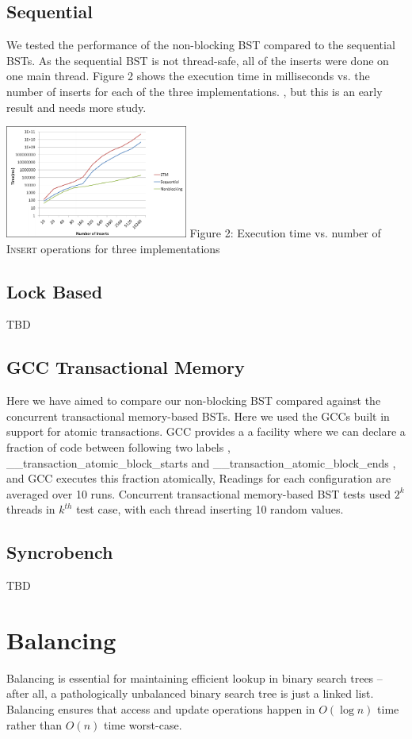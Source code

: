 \documentclass[10pt,pdftex,a4paper]{article}%
\begin{document}
\begin{multicols}{2}
\subsection{Sequential}
We tested the performance of the non-blocking BST compared to the sequential BSTs. As the sequential BST is not thread-safe, all of the inserts were done on one main thread. Figure 2 shows the execution time in milliseconds vs. the number of inserts for each of the three implementations. , but this is an early result and needs more study.
\begin{center}
\includegraphics[width=0.45\textwidth]{insertTime.png}
Figure 2: Execution time vs. number of \textsc{Insert} operations for three implementations
\end{center}
\subsection{Lock Based}
TBD
\subsection{GCC Transactional Memory}
Here we have aimed to compare our non-blocking BST compared against the concurrent transactional memory-based BSTs. Here we used the GCCs built in support for atomic transactions. GCC provides a a facility where we can declare a fraction of code between following two labels ,
\STATE\_\_transaction\_atomic\_block\_starts
and \STATE\_\_transaction\_atomic\_block\_ends
, and GCC executes this fraction atomically, Readings for each configuration are averaged over 10 runs.  Concurrent transactional memory-based BST tests used $2^k$ threads in $k^{th}$ test case, with each thread inserting 10 random values.

\subsection{Syncrobench}
TBD

\section{Balancing}
Balancing is essential for maintaining efficient lookup in binary search trees -- after all, a pathologically unbalanced binary search tree is just a linked list.  Balancing ensures that access and update operations happen in $O(\log n)$ time rather than $O(n)$ time worst-case.


\end{multicols}
\end{document}
